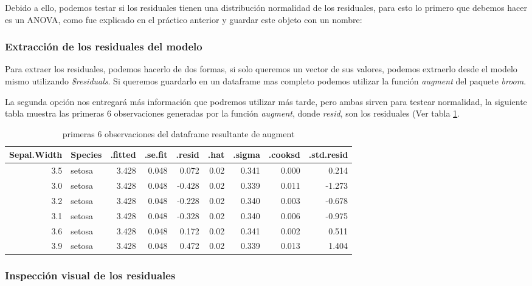 \documentclass[]{book}
\begin{document}
Debido a ello, podemos testar si los residuales tienen una distribución normalidad de los residuales, para esto lo primero que debemos hacer es un ANOVA, como fue explicado en el práctico anterior y guardar este objeto con un nombre:

\hypertarget{extraccion-de-los-residuales-del-modelo}{%
\subsubsection{Extracción de los residuales del modelo}\label{extraccion-de-los-residuales-del-modelo}}

Para extraer los residuales, podemos hacerlo de dos formas, si solo queremos un vector de sus valores, podemos extraerlo desde el modelo mismo utilizando \emph{\$residuals}. Si queremos guardarlo en un dataframe mas completo podemos utilizar la función \emph{augment} del paquete \emph{broom}.

La segunda opción nos entregará más información que podremos utilizar más tarde, pero ambas sirven para testear normalidad, la siguiente tabla muestra las primeras 6 observaciones generadas por la función \emph{augment}, donde \emph{resid}, son los residuales (Ver tabla \ref{tab:TabResid}.

\begin{table}[t]

\caption{\label{tab:TabResid}primeras 6 observaciones del dataframe resultante de augment}
\centering
\begin{tabular}{r|l|r|r|r|r|r|r|r}
\hline
Sepal.Width & Species & .fitted & .se.fit & .resid & .hat & .sigma & .cooksd & .std.resid\\
\hline
3.5 & setosa & 3.428 & 0.048 & 0.072 & 0.02 & 0.341 & 0.000 & 0.214\\
\hline
3.0 & setosa & 3.428 & 0.048 & -0.428 & 0.02 & 0.339 & 0.011 & -1.273\\
\hline
3.2 & setosa & 3.428 & 0.048 & -0.228 & 0.02 & 0.340 & 0.003 & -0.678\\
\hline
3.1 & setosa & 3.428 & 0.048 & -0.328 & 0.02 & 0.340 & 0.006 & -0.975\\
\hline
3.6 & setosa & 3.428 & 0.048 & 0.172 & 0.02 & 0.341 & 0.002 & 0.511\\
\hline
3.9 & setosa & 3.428 & 0.048 & 0.472 & 0.02 & 0.339 & 0.013 & 1.404\\
\hline
\end{tabular}
\end{table}

\hypertarget{inspeccion-visual-de-los-residuales}{%
\subsubsection{Inspección visual de los residuales}\label{inspeccion-visual-de-los-residuales}}
\end{document}
